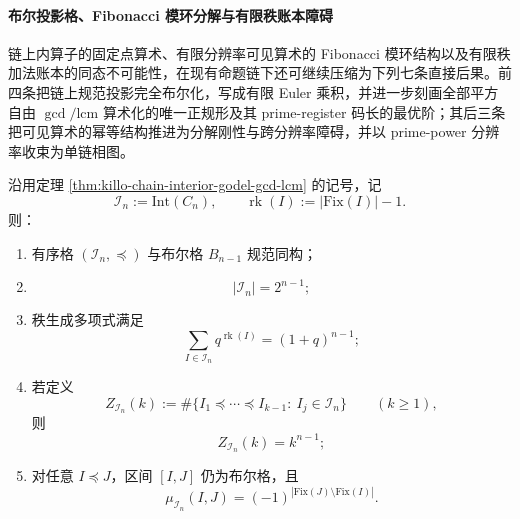 \paragraph{布尔投影格、Fibonacci 模环分解与有限秩账本障碍}
链上内算子的固定点算术、有限分辨率可见算术的 Fibonacci 模环结构以及有限秩加法账本的同态不可能性，在现有命题链下还可继续压缩为下列七条直接后果。前四条把链上规范投影完全布尔化，写成有限 Euler 乘积，并进一步刻画全部平方自由 \(\gcd/\mathrm{lcm}\) 算术化的唯一正规形及其 prime-register 码长的最优阶；其后三条把可见算术的幂等结构推进为分解刚性与跨分辨率障碍，并以 prime-power 分辨率收束为单链相图。

\begin{theorem}[链上内算子格的布尔刚性与旗标闭式]\label{thm:xi-chain-interior-boolean-flag-closed-form}
沿用定理 \ref{thm:killo-chain-interior-godel-gcd-lcm} 的记号，记
\[
\mathcal I_n:=\mathrm{Int}(C_n),
\qquad
\operatorname{rk}(I):=|\mathrm{Fix}(I)|-1.
\]
则：
\begin{enumerate}
  \item 有序格 \((\mathcal I_n,\preceq)\) 与布尔格 \(B_{n-1}\) 规范同构；
  \item
  \[
  |\mathcal I_n|=2^{n-1};
  \]
  \item 秩生成多项式满足
  \[
  \sum_{I\in\mathcal I_n}q^{\operatorname{rk}(I)}=(1+q)^{n-1};
  \]
  \item 若定义
  \[
  Z_{\mathcal I_n}(k)
  :=
  \#\{I_1\preceq\cdots\preceq I_{k-1}:\ I_j\in\mathcal I_n\}
  \qquad(k\ge 1),
  \]
  则
  \[
  Z_{\mathcal I_n}(k)=k^{n-1};
  \]
  \item 对任意 \(I\preceq J\)，区间 \([I,J]\) 仍为布尔格，且
  \[
  \mu_{\mathcal I_n}(I,J)=(-1)^{|\mathrm{Fix}(J)\setminus \mathrm{Fix}(I)|}.
  \]
\end{enumerate}
\end{theorem}
